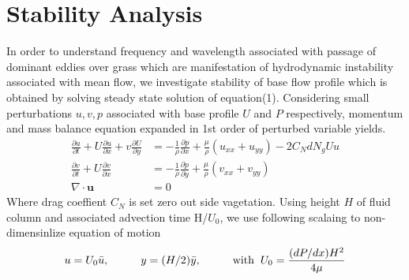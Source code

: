 \documentclass[aps,preprint,floatfix,prl]{revtex4-1}
\newcommand{\bu}{\mathbf{u}}
\newcommand{\del}{\partial}
\begin{document}
\section{Stability Analysis}
In order to understand frequency and wavelength associated with passage of dominant eddies over grass which are manifestation of hydrodynamic instability associated with mean flow, 
we investigate stability of base flow profile which is obtained by solving steady state solution of equation(1). Considering small perturbations $u, v, p$  associated 
with base profile $U$ and $P$ respectively, momentum and mass balance equation expanded in 1st order of perturbed variable yields.
\begin{equation}
\begin{split}
 \frac{\del u}{\del t}+U\frac{\del u}{\del x}+v\frac{\del U}{\del y} &= -\frac{1}{\rho}\frac{\del p}{\del x}+\frac{\mu}{\rho}(u_{xx}+u_{yy})-2C_{N}dN_{g}Uu\\
 \frac{\del v}{\del  t}+ U\frac{\del v}{\del x} &= -\frac{1}{\rho}\frac{\del p}{\del y}+\frac{\mu}{\rho}(v_{xx}+v_{yy})\\
 \nabla\cdot \bu &= 0
\end{split}
\end{equation}
Where drag coeffient $C_N$ is set zero out side vagetation. Using height $H$ of fluid column and associated advection time H/$U_{0}$, we use following scalaing to non-dimensinlize equation 
of motion
   \[ u = U_{0}\bar{u},\hspace{1cm} y = (H/2)\bar{y}, \hspace{1cm} \text{with}\hspace{2mm} U_{0}=\frac{(dP/dx)H^2}{4\mu} \]
\end{document}

